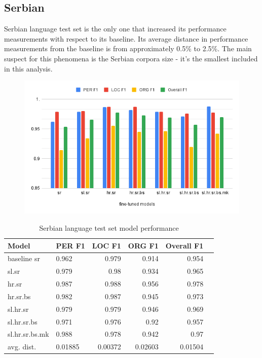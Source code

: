 \documentclass[sigconf]{acmart}
\begin{document}
\subsection{Serbian}
Serbian language test set is the only one that increased its performance measurements with respect to its baseline.
Its average distance in performance measurements from the baseline is from approximately 0.5\% to 2.5\%.
The main suspect for this phenomena is the Serbian corpora size - it's the smallest included in this analysis.
\begin{figure}[h]
  \label{fig:eval_sr}
  \centering
  \includegraphics[width=\linewidth]{eval_sr}
\end{figure}

\begin{table}[H]
  \caption{Serbian language test set model performance}
  \label{tab:eval_sr}
  \begin{tabular}{llrrrr}
    \toprule
    Model&PER F1&LOC F1&ORG F1&Overall F1\\
    \midrule
    baseline sr&0.962&0.979&0.914&0.954\\
    \midrule
    sl.sr&0.979&0.98&0.934&0.965\\
    hr.sr&0.987&0.988&0.956&0.978\\
    hr.sr.bs&0.982&0.987&0.945&0.973\\
    sl.hr.sr&0.979&0.979&0.946&0.969\\
    sl.hr.sr.bs&0.971&0.976&0.92&0.957\\
    sl.hr.sr.bs.mk&0.988&0.978&0.942&0.97\\
    \midrule
    avg. dist.&0.01885&0.00372&0.02603&0.01504\\
    \bottomrule
  \end{tabular}
\end{table}
\end{document}
